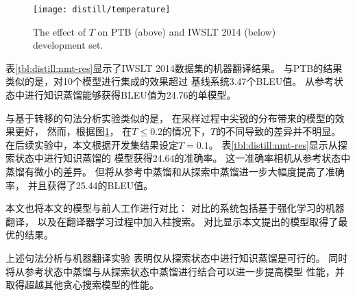 \begin{figure}[t]
	\centering
	\texttt{[image: distill/temperature]}
	\caption{The effect of $T$ on PTB (above)
		and IWSLT 2014 (below) development set.
	}\label{fig:distill:temperature}
\end{figure}

表\ref{tbl:distill:nmt-res}显示了IWSLT 2014数据集的机器翻译结果。
与PTB的结果类似的是，对10个模型进行集成的效果超过
基线系统3.47个BLEU值。
从参考状态中进行知识蒸馏能够获得BLEU值为24.76的单模型。


与基于转移的句法分析实验类似的是，
在采样过程中尖锐的分布带来的模型的效果更好，
然而，根据图\ref{fig:distill:temperature}，
在$T\le0.2$的情况下，$T$的不同导致的差异并不明显。
在后续实验中，本文根据开发集结果设定$T=0.1$。
表\ref{tbl:distill:nmt-res}显示从探索状态中进行知识蒸馏的
模型获得24.64的准确率。
这一准确率相机从参考状态中蒸馏有微小的差异。
但将从参考中蒸馏和从探索中蒸馏进一步大幅度提高了准确率，
并且获得了25.44的BLEU值。

本文也将本文的模型与前人工作进行对比：
对比的系统包括基于强化学习的机器翻译\cite{DBLP:journals/corr/RanzatoCAZ15}，
以及在翻译器学习过程中加入柱搜索\cite{wiseman-rush:2016:EMNLP2016}。
对比显示本文提出的模型取得了最优的结果。

上述句法分析与机器翻译实验
表明仅从探索状态中进行知识蒸馏是可行的。
同时将从参考状态中蒸馏与从探索状态中蒸馏进行结合可以进一步提高模型
性能，并取得超越其他贪心搜索模型的性能。

%
%

